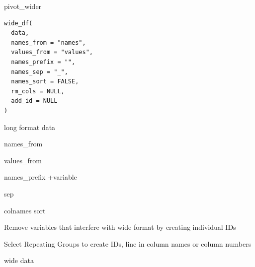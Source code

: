 \documentclass[a4paper]{book}
\begin{document}
%
\begin{Description}
pivot\_wider
\end{Description}
%
\begin{Usage}
\begin{verbatim}
wide_df(
  data,
  names_from = "names",
  values_from = "values",
  names_prefix = "",
  names_sep = "_",
  names_sort = FALSE,
  rm_cols = NULL,
  add_id = NULL
)
\end{verbatim}
\end{Usage}
%
\begin{Arguments}
\begin{ldescription}
\item[\code{data}] long format data

\item[\code{names\_from}] names\_from

\item[\code{values\_from}] values\_from

\item[\code{names\_prefix}] names\_prefix +variable

\item[\code{names\_sep}] sep

\item[\code{names\_sort}] colnames sort

\item[\code{rm\_cols}] Remove variables that interfere with wide format by creating individual IDs

\item[\code{add\_id}] Select Repeating Groups to create IDs, line in column names or column numbers
\end{ldescription}
\end{Arguments}
%
\begin{Value}
wide data
\end{Value}
%
\end{document}
